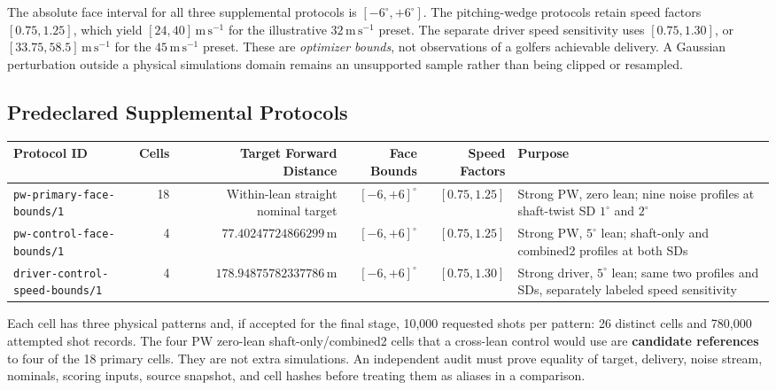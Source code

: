 \documentclass[
]{article}
\begin{document}
The absolute face interval for all three supplemental protocols is
\([-6^\circ,+6^\circ]\). The pitching-wedge protocols retain speed
factors \([0.75,1.25]\), which yield \([24,40]\,\mathrm{m\,s^{-1}}\) for
the illustrative \(32\,\mathrm{m\,s^{-1}}\) preset. The separate driver
speed sensitivity uses \([0.75,1.30]\), or
\([33.75,58.5]\,\mathrm{m\,s^{-1}}\) for the \(45\,\mathrm{m\,s^{-1}}\)
preset. These are \emph{optimizer bounds}, not observations of a
golfer\textquotesingle s achievable delivery. A Gaussian perturbation
outside a physical simulation\textquotesingle s domain remains an
unsupported sample rather than being clipped or resampled.

\subsection{Predeclared Supplemental
Protocols}\label{predeclared-supplemental-protocols}

\begin{longtable}[]{@{}lrrrrl@{}}
\toprule\noalign{}
Protocol ID & Cells & Target Forward Distance & Face Bounds & Speed
Factors & Purpose \\
\midrule\noalign{}
\endhead
\bottomrule\noalign{}
\endlastfoot
\texttt{pw-primary-face-bounds/1} & 18 & Within-lean straight nominal
target & \([-6,+6]^\circ\) & \([0.75,1.25]\) & Strong PW, zero lean;
nine noise profiles at shaft-twist SD \(1^\circ\) and \(2^\circ\) \\
\texttt{pw-control-face-bounds/1} & 4 &
\(77.40247724866299\,\mathrm{m}\) & \([-6,+6]^\circ\) & \([0.75,1.25]\)
& Strong PW, \(5^\circ\) lean; shaft-only and combined2 profiles at both
SDs \\
\texttt{driver-control-speed-bounds/1} & 4 &
\(178.94875782337786\,\mathrm{m}\) & \([-6,+6]^\circ\) & \([0.75,1.30]\)
& Strong driver, \(5^\circ\) lean; same two profiles and SDs, separately
labeled speed sensitivity \\
\end{longtable}

Each cell has three physical patterns and, if accepted for the final
stage, 10,000 requested shots per pattern: 26 distinct cells and 780,000
attempted shot records. The four PW zero-lean shaft-only/combined2 cells
that a cross-lean control would use are \textbf{candidate references} to
four of the 18 primary cells. They are not extra simulations. An
independent audit must prove equality of target, delivery, noise stream,
nominals, scoring inputs, source snapshot, and cell hashes before
treating them as aliases in a comparison.
\end{document}
